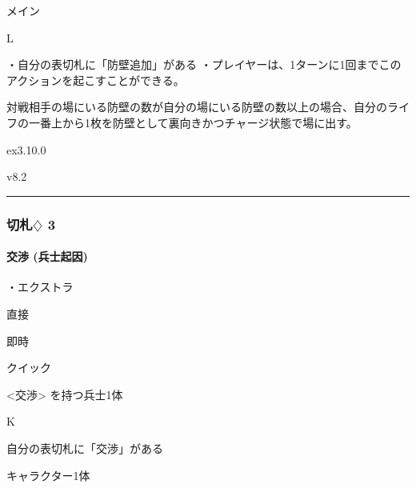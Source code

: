 \documentclass[letterpaper,10pt,dvipdfmx]{sphinxmanual}
\begin{document}
\sphinxAtStartPar
{} メイン

\sphinxAtStartPar
{} L

\sphinxAtStartPar
{}

\sphinxAtStartPar
・自分の表切札に「防壁追加」がある
・プレイヤーは、1ターンに1回までこのアクションを起こすことができる。

\sphinxAtStartPar
{}

\sphinxAtStartPar
対戦相手の場にいる防壁の数が自分の場にいる防壁の数以上の場合、自分のライフの一番上から1枚を防壁として裏向きかつチャージ状態で場に出す。

\sphinxAtStartPar
{}  ex3.10.0

\sphinxAtStartPar
{}  v8.2


\bigskip\hrule\bigskip



\subsubsection{切札{\normalsize $\diamondsuit$} 3}
\label{\detokenize{auto/frameActionlist:id53}}

\paragraph{交渉 (兵士起因)}
\label{\detokenize{auto/frameActionlist:act-negotiate}}\label{\detokenize{auto/frameActionlist:id54}}
\sphinxAtStartPar
{}

\sphinxAtStartPar
・エクストラ

\sphinxAtStartPar
{} 直接

\sphinxAtStartPar
{} 即時

\sphinxAtStartPar
{} クイック

\sphinxAtStartPar
{} \textless{}交渉\textgreater{} を持つ兵士1体

\sphinxAtStartPar
{} K

\sphinxAtStartPar
{}

\sphinxAtStartPar
自分の表切札に「交渉」がある

\sphinxAtStartPar
{}

\sphinxAtStartPar
キャラクター1体
\end{document}

